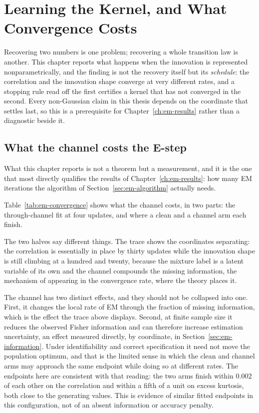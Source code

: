 \chapter{Learning the Kernel, and What Convergence Costs}\label{ch:em-kernel}

Recovering two numbers is one problem; recovering a whole transition law is
another. This chapter reports what happens when the innovation is represented
nonparametrically, and the finding is not the recovery itself but its
\emph{schedule}: the correlation and the innovation shape converge at very
different rates, and a stopping rule read off the first certifies a kernel that
has not converged in the second. Every non-Gaussian claim in this thesis
depends on the coordinate that settles last, so this is a prerequisite for
Chapter~\ref{ch:em-results} rather than a diagnostic beside it.

\section{What the channel costs the E-step}\label{sec:em-convergence}

What this chapter reports is not a theorem but a measurement, and it is the
one that most directly qualifies the results of Chapter~\ref{ch:em-results}:
how many EM iterations the algorithm of Section~\ref{sec:em-algorithm}
actually needs.

Table~\ref{tab:em-convergence} shows what the channel costs, in two parts: the
through-channel fit at four updates, and where a clean and a channel arm each
finish.



\noindent The two halves say different things. The trace shows the coordinates
separating: the correlation is essentially in place by thirty updates while the
innovation shape is still climbing at a hundred and twenty, because the mixture
label is a latent variable of its own and the channel compounds the missing
information, the mechanism of \citet{dempster1977maximum} appearing in the
convergence rate, where the theory places it.

The channel has two distinct effects, and they should not be collapsed into
one. First, it changes the local rate of EM through the fraction of missing
information, which is the effect the trace above displays. Second, at finite
sample size it reduces the observed Fisher information and can therefore
increase estimation uncertainty, an effect measured directly, by coordinate,
in Section~\ref{sec:em-information}. Under identifiability and correct
specification it need not move the population optimum, and that is the limited
sense in which the clean and channel arms may approach the same endpoint while
doing so at different rates. The endpoints here are consistent with that
reading: the two arms finish within $0.002$ of each other on the correlation
and within a fifth of a unit on excess kurtosis, both close to the generating
values. This is evidence of similar fitted endpoints in this configuration, not
of an absent information or accuracy penalty.

